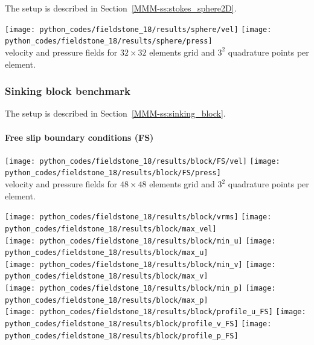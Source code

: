 The setup is described in Section~\ref{MMM-ss:stokes_sphere2D}.

\begin{center}
\texttt{[image: python\_codes/fieldstone\_18/results/sphere/vel]}
\texttt{[image: python\_codes/fieldstone\_18/results/sphere/press]}\\
{\captionfont velocity and pressure fields for $32\times 32$ elements grid and $3^2$
quadrature points per element.}
\end{center}

\subsubsection*{Sinking block benchmark}

The setup is described in Section~\ref{MMM-ss:sinking_block}.

\paragraph{Free slip boundary conditions (FS)}

\begin{center}
\texttt{[image: python\_codes/fieldstone\_18/results/block/FS/vel]}
\texttt{[image: python\_codes/fieldstone\_18/results/block/FS/press]}\\
{\captionfont velocity and pressure fields for $48\times 48$ elements grid and $3^2$
quadrature points per element.}
\end{center}


\begin{center}
\texttt{[image: python\_codes/fieldstone\_18/results/block/vrms]}
\texttt{[image: python\_codes/fieldstone\_18/results/block/max\_vel]}\\
\texttt{[image: python\_codes/fieldstone\_18/results/block/min\_u]}
\texttt{[image: python\_codes/fieldstone\_18/results/block/max\_u]}\\
\texttt{[image: python\_codes/fieldstone\_18/results/block/min\_v]}
\texttt{[image: python\_codes/fieldstone\_18/results/block/max\_v]}\\
\texttt{[image: python\_codes/fieldstone\_18/results/block/min\_p]}
\texttt{[image: python\_codes/fieldstone\_18/results/block/max\_p]}\\
\texttt{[image: python\_codes/fieldstone\_18/results/block/profile\_u\_FS]}
\texttt{[image: python\_codes/fieldstone\_18/results/block/profile\_v\_FS]}
\texttt{[image: python\_codes/fieldstone\_18/results/block/profile\_p\_FS]}
\end{center}

